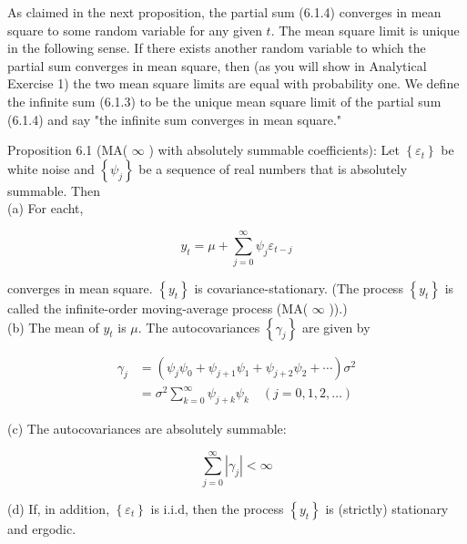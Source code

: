 \documentclass[10pt]{article}
\begin{document}
As claimed in the next proposition, the partial sum (6.1.4) converges in mean square to some random variable for any given $t$. The mean square limit is unique in the following sense. If there exists another random variable to which the partial sum converges in mean square, then (as you will show in Analytical Exercise 1) the two mean square limits are equal with probability one. We define the infinite sum (6.1.3) to be the unique mean square limit of the partial sum (6.1.4) and say "the infinite sum converges in mean square."

Proposition 6.1 (MA( $\infty$ ) with absolutely summable coefficients): Let $\left\{\varepsilon_{t}\right\}$ be white noise and $\left\{\psi_{j}\right\}$ be a sequence of real numbers that is absolutely summable. Then\\
(a) For eacht,


\begin{equation*}
y_{t}=\mu+\sum_{j=0}^{\infty} \psi_{j} \varepsilon_{t-j} \tag{6.1.6}
\end{equation*}


converges in mean square. $\left\{y_{t}\right\}$ is covariance-stationary. (The process $\left\{y_{t}\right\}$ is called the infinite-order moving-average process (MA( $\infty$ )).)\\
(b) The mean of $y_{t}$ is $\mu$. The autocovariances $\left\{\gamma_{j}\right\}$ are given by


\begin{align*}
\gamma_{j} & =\left(\psi_{j} \psi_{0}+\psi_{j+1} \psi_{1}+\psi_{j+2} \psi_{2}+\cdots\right) \sigma^{2} \\
& =\sigma^{2} \sum_{k=0}^{\infty} \psi_{j+k} \psi_{k} \quad(j=0,1,2, \ldots) \tag{6.1.7}
\end{align*}


(c) The autocovariances are absolutely summable:


\begin{equation*}
\sum_{j=0}^{\infty}\left|\gamma_{j}\right|<\infty \tag{6.1.8}
\end{equation*}


(d) If, in addition, $\left\{\varepsilon_{t}\right\}$ is i.i.d, then the process $\left\{y_{t}\right\}$ is (strictly) stationary and ergodic.
\end{document}
